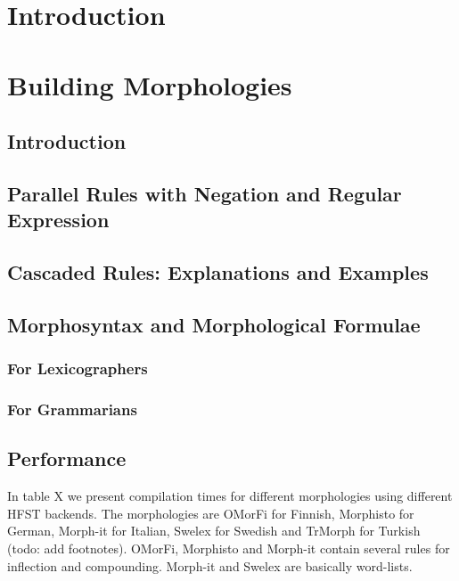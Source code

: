 \documentclass{llncs}
\begin{document}
\section*{Introduction}

\section{Building Morphologies}

\subsection{Introduction}

\subsection{Parallel Rules with Negation and Regular Expression}

\subsection{Cascaded Rules: Explanations and Examples}

\subsection{Morphosyntax and Morphological Formulae}

\subsubsection{For Lexicographers}

\subsubsection{For Grammarians}

\subsection{Performance}

In table X we present compilation times for different morphologies using 
different HFST backends. The morphologies are OMorFi for Finnish, Morphisto 
for German, Morph-it for Italian, Swelex for Swedish and TrMorph for Turkish 
(todo: add footnotes). OMorFi, Morphisto and Morph-it contain several rules for
inflection and compounding. Morph-it and Swelex are basically word-lists.
\end{document}
